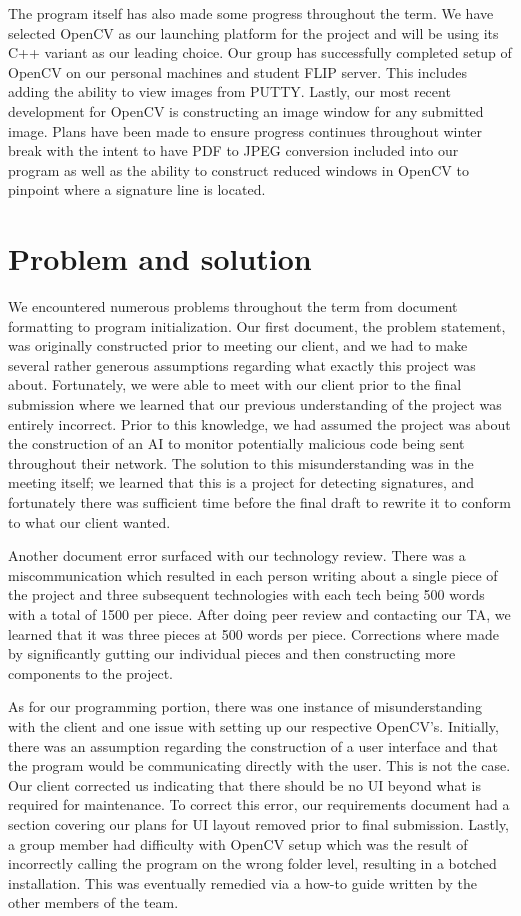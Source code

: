 \documentclass[onecolumn, draftclsnofoot,10pt, compsoc]{IEEEtran}
\begin{document}
The program itself has also made some progress throughout the term. We have selected OpenCV as our launching platform for the project and will be using its C++ variant as our leading choice. Our group has successfully completed setup of OpenCV on our personal machines and student FLIP server. This includes adding the ability to view images from PUTTY. Lastly, our most recent development for OpenCV is constructing an image window for any submitted image. Plans have been made to ensure progress continues throughout winter break with the intent to have PDF to JPEG conversion included into our program as well as the ability to construct reduced windows in OpenCV to pinpoint where a signature line is located.

\section{Problem and solution}
We encountered numerous problems throughout the term from document formatting to program initialization. Our first document, the problem statement, was originally constructed prior to meeting our client, and we had to make several rather generous assumptions regarding what exactly this project was about. Fortunately, we were able to meet with our client prior to the final submission where we learned that our previous understanding of the project was entirely incorrect. Prior to this knowledge, we had assumed the project was about the construction of an AI to monitor potentially malicious code being sent throughout their network. The solution to this misunderstanding was in the meeting itself; we learned that this is a project for detecting signatures, and fortunately there was sufficient time before the final draft to rewrite it to conform to what our client wanted.

Another document error surfaced with our technology review. There was a miscommunication which resulted in each person writing about a single piece of the project and three subsequent technologies with each tech being 500 words with a total of 1500 per piece. After doing peer review and contacting our TA, we learned that it was three pieces at 500 words per piece. Corrections where made by significantly gutting our individual pieces and then constructing more components to the project. 

As for our programming portion, there was one instance of misunderstanding with the client and one issue with setting up our respective OpenCV’s. Initially, there was an assumption regarding the construction of a user interface and that the program would be communicating directly with the user. This is not the case. Our client corrected us indicating that there should be no UI beyond what is required for maintenance. To correct this error, our requirements document had a section covering our plans for UI layout removed prior to final submission. Lastly, a group member had difficulty with OpenCV setup which was the result of incorrectly calling the program on the wrong folder level, resulting in a botched installation. This was eventually remedied via a how-to guide written by the other members of the team.
\end{document}
